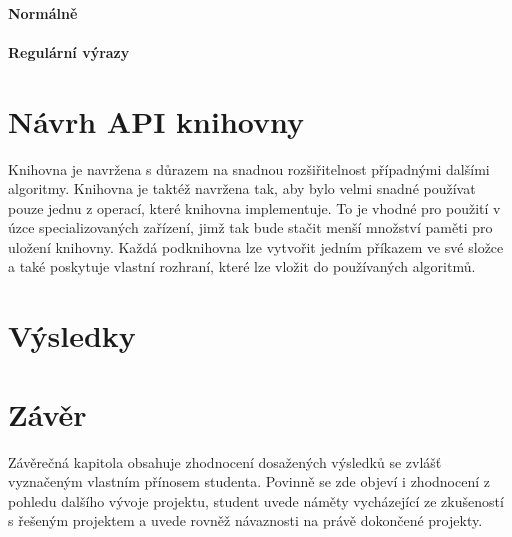 \subsubsection{Normálně}
\subsubsection{Regulární výrazy}
\subsection{}
\chapter{Návrh API knihovny}
Knihovna je navržena s důrazem na snadnou rozšiřitelnost případnými dalšími algoritmy.
Knihovna je taktéž navržena tak, aby bylo velmi snadné používat pouze jednu z operací, které knihovna implementuje.
To je vhodné pro použití v úzce specializovaných zařízení, jimž tak bude stačit menší množství paměti pro uložení knihovny.
Každá podknihovna lze vytvořit jedním příkazem ve své složce a také poskytuje vlastní rozhraní, které lze vložit do používaných algoritmů.

\chapter{Výsledky}

\chapter{Závěr}
Závěrečná kapitola obsahuje zhodnocení dosažených výsledků se zvlášť vyznačeným vlastním přínosem studenta. Povinně se zde objeví i zhodnocení z pohledu dalšího vývoje projektu, student uvede náměty vycházející ze zkušeností s řešeným projektem a uvede rovněž návaznosti na právě dokončené projekty.

